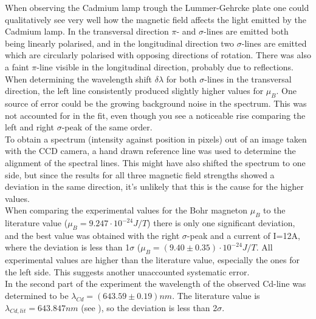 \documentclass[12pt]{article}
\begin{document}
When observing the Cadmium lamp trough the Lummer-Gehrcke plate one could qualitatively see very well how the magnetic field affects the light emitted by the Cadmium lamp. In the transversal direction $\pi$- and $\sigma$-lines are emitted both being linearly polarised, and in the longitudinal direction two $\sigma$-lines are emitted which are circularly polarised with opposing directions of rotation. There was also a faint $\pi$-line visible in the longitudinal direction, probably due to reflections.
\\When determining the wavelength shift $\delta \lambda$ for both $\sigma$-lines in the transversal direction, the left line consistently produced slightly higher values for $\mu_B$. One source of error could be the growing background noise in the spectrum. This was not accounted for in the fit, even though you see a noticeable rise comparing the left and right $\sigma$-peak of the same order. 
\\To obtain a spectrum (intensity against position in pixels) out of an image taken with the CCD camera, a hand drawn reference line was used to determine the alignment of the spectral lines. This might have also shifted the spectrum to one side, but since the results for all three magnetic field strengths showed a deviation in the same direction, it's unlikely that this is the cause for the higher values. 
\\When comparing the experimental values for the Bohr magneton $\mu_B$ to the literature value ($\mu_B=9.247\cdot10^{-24}J/T$) there is only one significant deviation, and the best value was obtained with the right $\sigma$-peak and a current of I=12A, where the deviation is less than 1$\sigma$ ($\mu_B=(9.40\pm0.35)\cdot10^{-24}J/T$. All experimental values are higher than the literature value, especially the ones for the left side. This suggests another unaccounted systematic error.
\\In the second part of the experiment the wavelength of the observed Cd-line was determined to be $\lambda_{Cd}=(643.59\pm0.19)nm$. The literature value is $\lambda_{Cd, lit}=643.847nm$ (see \cite{nist}), so the deviation is less than 2$\sigma$. 
\end{document}
